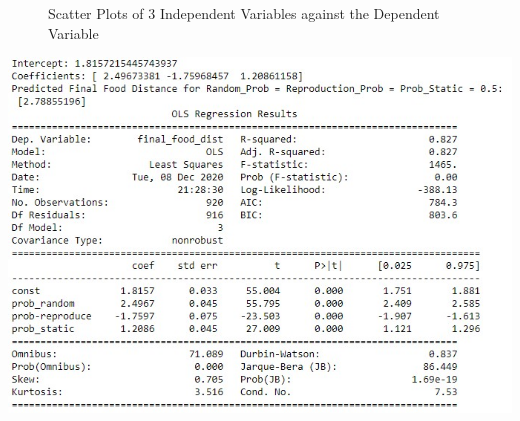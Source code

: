 \documentclass[a4paper, 12pt]{article}
\begin{document}
\begin{figure}[h!]
\centering
{}

\caption{Scatter Plots of 3 Independent Variables against the Dependent Variable}
\label{fig:Graphs}
\end{figure}
\begin{center}
    \includegraphics[scale = 0.9]{Images/data.jpg}
\end{center}
\newpage
\end{document}
